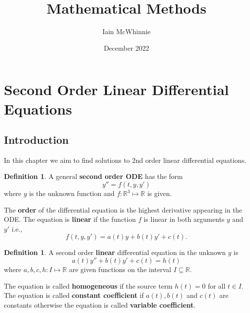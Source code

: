 \documentclass{article}
\title{Mathematical Methods}
\author{Iain McWhinnie}
\date{December 2022}
\theoremstyle{plain}
\theoremstyle{definition}
\newtheorem{definition}[thm]{Definition}
\numberwithin{equation}{section}
\begin{document}
\maketitle

\tableofcontents

\pagebreak
\section{Second Order Linear Differential Equations}

\subsection{Introduction}

In this chapter we aim to find solutions to 2nd order linear differential equations.

\begin{definition}
A general \textbf{second order ODE} has the form
\[
y'' = f(t,y,y')
\]
where $y$ is the unknown function and $f: \mathbb{R}^3 \mapsto \mathbb{R}$ is given.


The \textbf{order} of the differential equation  is the highest derivative appearing in the ODE. The equation is \textbf{linear} if the function $f$ is linear in both arguments $y$ and $y'$ i.e.,
\[
f(t,y,y') = a(t)y + b(t)y' + c(t).
\]

\end{definition}

\begin{definition}
    A second order \textbf{linear} differential equation in the unknown $y$ is
    \begin{equation}
        a(t)y'' + b(t)y' + c(t) = h(t)
    \end{equation}
    where $a,b,c,h: I \mapsto \mathbb{R}$ are given functions on the interval $I \subseteq \mathbb{R}$. 
    
    The equation is called \textbf{homogeneous} if the source term $h(t)=0$ for all $t\in I$. The equation is called \textbf{constant coefficient} if $a(t), b(t)$ and $c(t)$ are constants otherwise the equation is called \textbf{variable coefficient}.

\end{definition}
\end{document}
